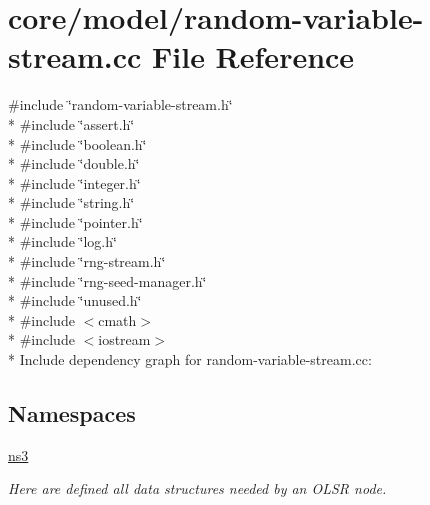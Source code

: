 \hypertarget{random-variable-stream_8cc}{}\section{core/model/random-\/variable-\/stream.cc File Reference}
\label{random-variable-stream_8cc}
{\ttfamily \#include \char`\"{}random-\/variable-\/stream.\+h\char`\"{}}\\*
{\ttfamily \#include \char`\"{}assert.\+h\char`\"{}}\\*
{\ttfamily \#include \char`\"{}boolean.\+h\char`\"{}}\\*
{\ttfamily \#include \char`\"{}double.\+h\char`\"{}}\\*
{\ttfamily \#include \char`\"{}integer.\+h\char`\"{}}\\*
{\ttfamily \#include \char`\"{}string.\+h\char`\"{}}\\*
{\ttfamily \#include \char`\"{}pointer.\+h\char`\"{}}\\*
{\ttfamily \#include \char`\"{}log.\+h\char`\"{}}\\*
{\ttfamily \#include \char`\"{}rng-\/stream.\+h\char`\"{}}\\*
{\ttfamily \#include \char`\"{}rng-\/seed-\/manager.\+h\char`\"{}}\\*
{\ttfamily \#include \char`\"{}unused.\+h\char`\"{}}\\*
{\ttfamily \#include $<$cmath$>$}\\*
{\ttfamily \#include $<$iostream$>$}\\*
Include dependency graph for random-\/variable-\/stream.cc\+:
\subsection*{Namespaces}
\begin{DoxyCompactItemize}
\item 
 \hyperlink{namespacens3}{ns3}
\begin{DoxyCompactList}\small\item\em Here are defined all data structures needed by an O\+L\+SR node. \end{DoxyCompactList}\end{DoxyCompactItemize}
